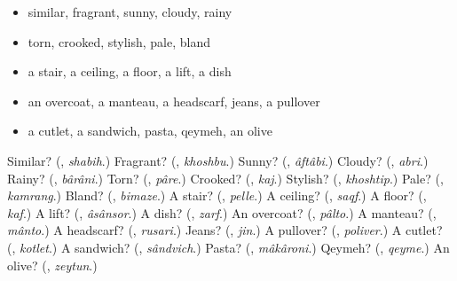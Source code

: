 \begin{itemize}
\raggedright
  \item similar, fragrant, sunny, cloudy, rainy
  \item torn, crooked, stylish, pale, bland
  \item a stair, a ceiling, a floor, a lift, a dish
  \item an overcoat, a manteau, a headscarf, jeans, a pullover
  \item a cutlet, a sandwich, pasta, qeymeh, an olive
\end{itemize}

\begin{tcolorbox}[breakable,colback=teal!4,colframe=teal!35!black,title={Before you move on}]
Similar? (\textbf{}, \emph{shabih}.) Fragrant? (\textbf{}, \emph{khoshbu}.) Sunny? (\textbf{}, \emph{âftâbi}.) Cloudy? (\textbf{}, \emph{abri}.) Rainy? (\textbf{}, \emph{bârâni}.) Torn? (\textbf{}, \emph{pâre}.) Crooked? (\textbf{}, \emph{kaj}.) Stylish? (\textbf{}, \emph{khoshtip}.) Pale? (\textbf{}, \emph{kamrang}.) Bland? (\textbf{}, \emph{bimaze}.) A stair? (\textbf{}, \emph{pelle}.) A ceiling? (\textbf{}, \emph{saqf}.) A floor? (\textbf{}, \emph{kaf}.) A lift? (\textbf{}, \emph{âsânsor}.) A dish? (\textbf{}, \emph{zarf}.) An overcoat? (\textbf{}, \emph{pâlto}.) A manteau? (\textbf{}, \emph{mânto}.) A headscarf? (\textbf{}, \emph{rusari}.) Jeans? (\textbf{}, \emph{jin}.) A pullover? (\textbf{}, \emph{poliver}.) A cutlet? (\textbf{}, \emph{kotlet}.) A sandwich? (\textbf{}, \emph{sândvich}.) Pasta? (\textbf{}, \emph{mâkâroni}.) Qeymeh? (\textbf{}, \emph{qeyme}.) An olive? (\textbf{}, \emph{zeytun}.)
\end{tcolorbox}

